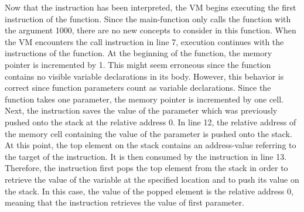 Now that the  instruction has been interpreted, the VM begins executing the first instruction of the  function.
Since the main-function only calls the  function with the argument 1000, there are no new concepts to consider in this function.
When the VM encounters the call instruction in line 7, execution continues with the instructions of the  function.
At the beginning of the  function, the memory pointer is incremented by 1.
This might seem erroneous since the  function contains no visible variable declarations in its body.
However, this behavior is correct since function parameters count as variable declarations.
Since the function takes one parameter, the memory pointer is incremented by one cell.
Next, the  instruction saves the value of the parameter which was previously pushed onto the stack at the relative address 0.
In line 12, the relative address of the memory cell containing the value of the parameter is pushed onto the stack.
At this point, the top element on the stack contains an address-value referring to the target of the  instruction.
It is then consumed by the  instruction in line 13.
Therefore, the instruction first pops the top element from the stack in order to
retrieve the value of the variable at the specified location and to push its value on the stack.
In this case, the value of the popped element is the relative address 0, meaning that the instruction retrieves the value of first parameter.

